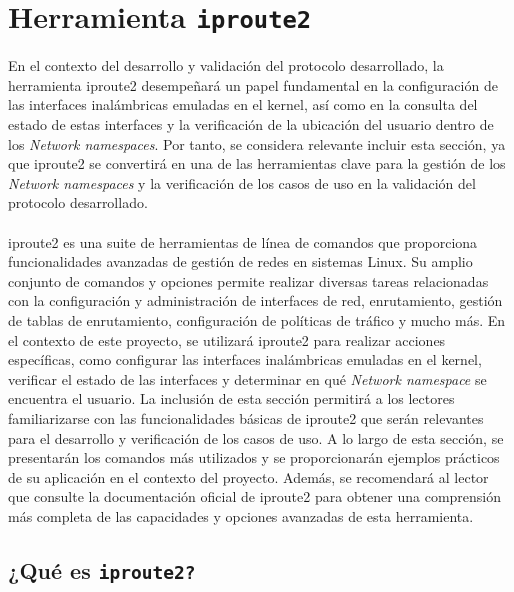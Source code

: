 \section{Herramienta \texttt{iproute2}}
\label{iproute2}
En el contexto del desarrollo y validación del protocolo desarrollado, la herramienta iproute2 desempeñará un papel fundamental en la configuración de las interfaces inalámbricas emuladas en el kernel, así como en la consulta del estado de estas interfaces y la verificación de la ubicación del usuario dentro de los \textit{Network namespaces}. Por tanto, se considera relevante incluir esta sección, ya que iproute2 se convertirá en una de las herramientas clave para la gestión de los \textit{Network namespaces} y la verificación de los casos de uso en la validación del protocolo desarrollado.\\
\\
iproute2 es una suite de herramientas de línea de comandos que proporciona funcionalidades avanzadas de gestión de redes en sistemas Linux. Su amplio conjunto de comandos y opciones permite realizar diversas tareas relacionadas con la configuración y administración de interfaces de red, enrutamiento, gestión de tablas de enrutamiento, configuración de políticas de tráfico y mucho más. En el contexto de este proyecto, se utilizará iproute2 para realizar acciones específicas, como configurar las interfaces inalámbricas emuladas en el kernel, verificar el estado de las interfaces y determinar en qué \textit{Network namespace} se encuentra el usuario. La inclusión de esta sección permitirá a los lectores familiarizarse con las funcionalidades básicas de iproute2 que serán relevantes para el desarrollo y verificación de los casos de uso. A lo largo de esta sección, se presentarán los comandos más utilizados y se proporcionarán ejemplos prácticos de su aplicación en el contexto del proyecto. Además, se recomendará al lector que consulte la documentación oficial de iproute2 para obtener una comprensión más completa de las capacidades y opciones avanzadas de esta herramienta.

\subsection{¿Qué es \texttt{iproute2?}}

